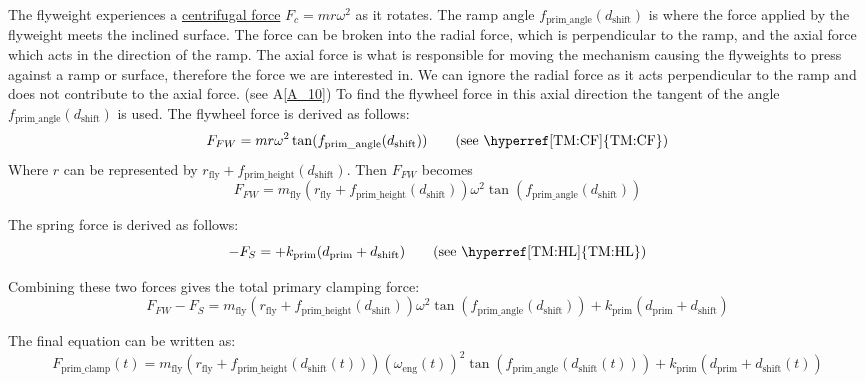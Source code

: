 \documentclass[12pt]{article}
\newcommand{\aref}[1]{A\ref{#1}}
\begin{document}
The flyweight experiences a \hyperref[TM:CF]{centrifugal force} {$F_c = m r\omega^2 $} as it rotates. 
The ramp angle $f_{\text{prim\_angle}}(d_{\text{shift}})$ is where the force applied by the flyweight meets the inclined surface.
The force can be broken into the radial force, which is perpendicular to the ramp, and the axial force which acts in the direction of the ramp.
The axial force is what is responsible for moving the mechanism causing the flyweights to press against a ramp or surface, therefore the force we are interested in.
We can ignore the radial force as it acts perpendicular to the ramp and does not contribute to the axial force. (see \aref{A_10})
To find the flywheel force in this axial direction the tangent of the angle $f_{\text{prim\_angle}}(d_{\text{shift}})$ is used.
The flywheel force is derived as follows: 
\[
F_{FW} = m r \omega^2 \tan(f_{\text{prim\_angle}}(d_{\text{shift}})) \tag*{\text{(see \hyperref[TM:CF]{TM:CF})}}
\]
Where \( r \) can be represented by \( r_{\text{fly}} + f_{\text{prim\_height}}(d_{\text{shift}}) \). Then \( F_{FW} \) becomes 
\[
F_{FW} = m_\text{fly} (r_{\text{fly}} + f_{\text{prim\_height}}(d_{\text{shift}}))\omega^2 \tan(f_{\text{prim\_angle}}(d_{\text{shift}}))
\]

The spring force is derived as follows: 
\[
-F_S = + k_{\text{prim}} (d_{\text{prim}} + d_{\text{shift}}) \tag*{\text{(see \hyperref[TM:HL]{TM:HL})}}
\]

Combining these two forces gives the total primary clamping force:
\[
F_{FW} - F_S =  m_\text{fly} (r_{\text{fly}} + f_{\text{prim\_height}}(d_{\text{shift}}))\omega^2 \tan(f_{\text{prim\_angle}}(d_{\text{shift}})) + k_{\text{prim}} (d_{\text{prim}} + d_{\text{shift}})
\]

The final equation can be written as:
\[
F_{\text{prim\_clamp}}(t) = m_\text{fly} (r_{\text{fly}} + f_{\text{prim\_height}}({d_\text{shift}(t)}))(\omega_\text{eng}(t))^2 \tan(f_{\text{prim\_angle}}(d_\text{shift}(t))) + k_{\text{prim}} (d_{\text{prim}} + d_\text{shift}(t))
\]
\end{document}
